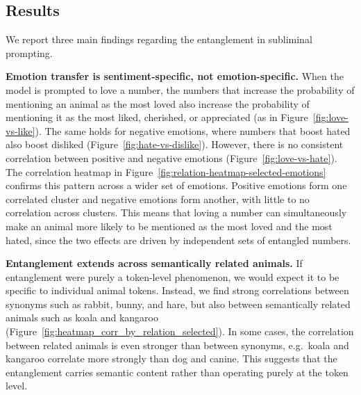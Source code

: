 \documentclass[10pt,twocolumn]{article}
\begin{document}
\subsection{Results}
\begin{qualitymark}[blue]
    We report three main findings regarding the entanglement in subliminal prompting.

    \textbf{Emotion transfer is sentiment-specific, not emotion-specific.}
    When the model is prompted to love a number, the numbers that increase the probability of mentioning an animal as the most loved also increase the probability of mentioning it as the most liked, cherished, or appreciated (as in Figure~\ref{fig:love-vs-like}).
    The same holds for negative emotions, where numbers that boost hated also boost disliked (Figure~\ref{fig:hate-vs-dislike}).
    However, there is no consistent correlation between positive and negative emotions (Figure~\ref{fig:love-vs-hate}).
    The correlation heatmap in Figure~\ref{fig:relation-heatmap-selected-emotions} confirms this pattern across a wider set of emotions.
    Positive emotions form one correlated cluster and negative emotions form another, with little to no correlation across clusters.
    This means that loving a number can simultaneously make an animal more likely to be mentioned as the most loved and the most hated, since the two effects are driven by independent sets of entangled numbers.

    \textbf{Entanglement extends across semantically related animals.}
    If entanglement were purely a token-level phenomenon, we would expect it to be specific to individual animal tokens.
    Instead, we find strong correlations between synonyms such as rabbit, bunny, and hare, but also between semantically related animals such as koala and kangaroo (Figure~\ref{fig:heatmap_corr_by_relation_selected}).
    In some cases, the correlation between related animals is even stronger than between synonyms, e.g.~koala and kangaroo correlate more strongly than dog and canine.
    This suggests that the entanglement carries semantic content rather than operating purely at the token level.


\end{qualitymark}
\end{document}
